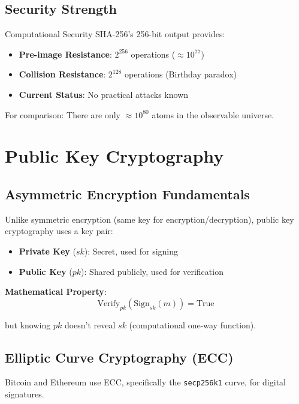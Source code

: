 \documentclass[11pt,a4paper]{article}
\begin{document}
\subsection{Security Strength}

\begin{keybox}{Computational Security}
SHA-256's 256-bit output provides:
\begin{itemize}
  \item \textbf{Pre-image Resistance}: $2^{256}$ operations ($\approx 10^{77}$)
  \item \textbf{Collision Resistance}: $2^{128}$ operations (Birthday paradox)
  \item \textbf{Current Status}: No practical attacks known
\end{itemize}

For comparison: There are only $\approx 10^{80}$ atoms in the observable universe.
\end{keybox}

\section{Public Key Cryptography}

\subsection{Asymmetric Encryption Fundamentals}

Unlike symmetric encryption (same key for encryption/decryption), public key cryptography uses a key pair:

\begin{itemize}
  \item \textbf{Private Key} ($sk$): Secret, used for signing
  \item \textbf{Public Key} ($pk$): Shared publicly, used for verification
\end{itemize}

\textbf{Mathematical Property}:
\[
\text{Verify}_{pk}(\text{Sign}_{sk}(m)) = \text{True}
\]

but knowing $pk$ doesn't reveal $sk$ (computational one-way function).

\subsection{Elliptic Curve Cryptography (ECC)}

Bitcoin and Ethereum use ECC, specifically the \texttt{secp256k1} curve, for digital signatures.
\end{document}

